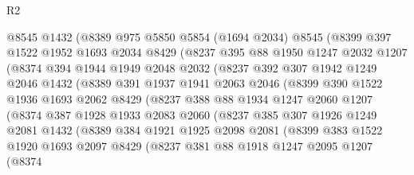 \begin{lexlean}{R2}
\begin{coremodule}
          @8545
          @1432
          (@8389
            @975
            @5850
            @5854
            (@1694 @2034)
            @8545
            (@8399
              @397
              @1522
              @1952
              @1693
              @2034
              @8429
              (@8237
                @395
                @88
                @1950
                @1247
                @2032
                @1207
                (@8374
                  @394
                  @1944
                  @1949
                  @2048
                  @2032
                  (@8237
                    @392
                    @307
                    @1942
                    @1249
                    @2046
                    @1432
                    (@8389
                      @391
                      @1937
                      @1941
                      @2063
                      @2046
                      (@8399
                        @390
                        @1522
                        @1936
                        @1693
                        @2062
                        @8429
                        (@8237
                          @388
                          @88
                          @1934
                          @1247
                          @2060
                          @1207
                          (@8374
                            @387
                            @1928
                            @1933
                            @2083
                            @2060
                            (@8237
                              @385
                              @307
                              @1926
                              @1249
                              @2081
                              @1432
                              (@8389
                                @384
                                @1921
                                @1925
                                @2098
                                @2081
                                (@8399
                                  @383
                                  @1522
                                  @1920
                                  @1693
                                  @2097
                                  @8429
                                  (@8237
                                    @381
                                    @88
                                    @1918
                                    @1247
                                    @2095
                                    @1207
                                    (@8374

\end{coremodule}
\end{lexlean}

